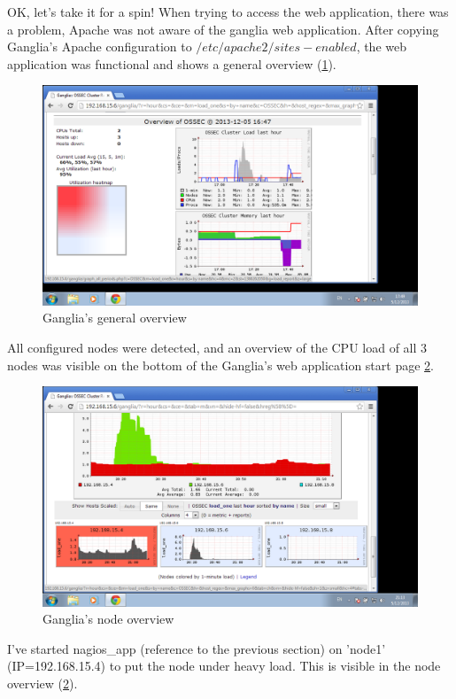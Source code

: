 \documentclass[12pt]{report}
\begin{document}
OK, let's take it for a spin! When trying to access the web
application, there was a problem, Apache was not aware of the ganglia
web application. After copying Ganglia's Apache configuration to
$/etc/apache2/sites-enabled$, the web application was functional and
shows a general overview (\cref{fig:ganglia_general}).
\begin{figure}[h!]
  \caption{Ganglia's general overview}
  \label{fig:ganglia_general}
  \centering
    \includegraphics[scale=0.3]{pics/ganglia_general.png}
\end{figure}
All configured nodes were detected, and an overview of the CPU load of
all 3 nodes was visible on the bottom of the Ganglia's web application
start page  \cref{fig:ganglia_node_overview}.
\begin{figure}[h!]
  \caption{Ganglia's node overview}
  \label{fig:ganglia_node_overview}
  \centering
    \includegraphics[scale=0.3]{pics/ganglia_node_overview.png}
\end{figure}
I've started nagios\_app (reference to the previous section) on 'node1'
(IP=192.168.15.4) to put the node under heavy load. This is
visible in the node overview (\cref{fig:ganglia_node_overview}).\\
\end{document}

